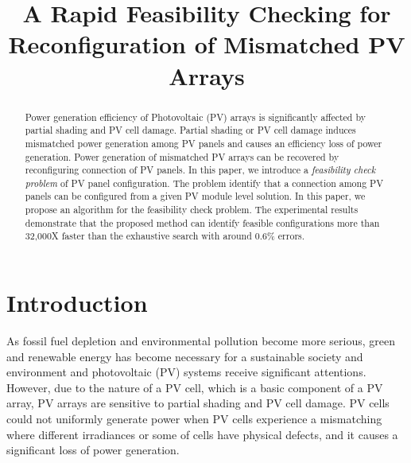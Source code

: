 \documentclass[conference]{IEEEtran}
\begin{document}
\title{A Rapid Feasibility Checking for Reconfiguration of Mismatched PV Arrays}
\author{
}
\maketitle

\begin{abstract}
Power generation efficiency of Photovoltaic (PV) arrays is significantly affected by partial shading and PV cell damage. Partial shading or PV cell damage induces mismatched power generation among PV panels and causes an efficiency loss of power generation. Power generation of mismatched PV arrays can be recovered by reconfiguring connection of PV panels. 
In this paper, we introduce a \textit{feasibility check problem} of PV panel configuration.
The problem identify that a connection among PV panels can be configured from a given PV module level solution. 
In this paper, we propose an algorithm for the feasibility check problem. The experimental results demonstrate that the proposed method can identify feasible configurations more than 32,000X faster than the exhaustive search with around 0.6\% errors. 
\end{abstract}


\section{Introduction}
As fossil fuel depletion and environmental pollution become more serious, green and renewable energy has become necessary for a sustainable society and environment and photovoltaic (PV) systems receive significant attentions. However, due to the nature of a PV cell, which is a basic component of a PV array, PV arrays are sensitive to partial shading and PV cell damage. PV cells could not uniformly generate power when PV cells experience a mismatching where different irradiances or some of cells have physical defects, and it causes a significant loss of power generation. 
\end{document}
